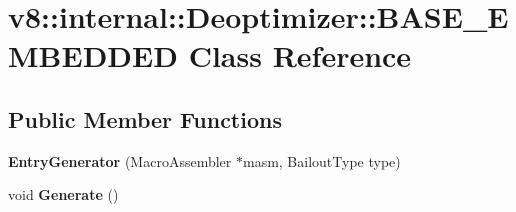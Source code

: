 \hypertarget{classv8_1_1internal_1_1_deoptimizer_1_1_b_a_s_e___e_m_b_e_d_d_e_d}{}\section{v8\+:\+:internal\+:\+:Deoptimizer\+:\+:B\+A\+S\+E\+\_\+\+E\+M\+B\+E\+D\+D\+E\+D Class Reference}
\label{classv8_1_1internal_1_1_deoptimizer_1_1_b_a_s_e___e_m_b_e_d_d_e_d}
\subsection*{Public Member Functions}
\begin{DoxyCompactItemize}
\item 
\hypertarget{classv8_1_1internal_1_1_deoptimizer_1_1_b_a_s_e___e_m_b_e_d_d_e_d_aae25089beddd785710a1bfaedfc42078}{}{\bfseries Entry\+Generator} (Macro\+Assembler $\ast$masm, Bailout\+Type type)\label{classv8_1_1internal_1_1_deoptimizer_1_1_b_a_s_e___e_m_b_e_d_d_e_d_aae25089beddd785710a1bfaedfc42078}

\item 
\hypertarget{classv8_1_1internal_1_1_deoptimizer_1_1_b_a_s_e___e_m_b_e_d_d_e_d_a1dcd8665286dd61a5cb6e02fe6e8b68f}{}void {\bfseries Generate} ()\label{classv8_1_1internal_1_1_deoptimizer_1_1_b_a_s_e___e_m_b_e_d_d_e_d_a1dcd8665286dd61a5cb6e02fe6e8b68f}

\end{DoxyCompactItemize}
